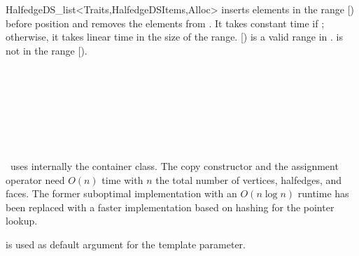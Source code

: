 \begin{ccRefClass}{HalfedgeDS_list<Traits,HalfedgeDSItems,Alloc>}
    {inserts elements in the range [) before position 
      and removes the elements from . It takes 
     constant time if \ccVar; otherwise, it takes linear
     time in the size of the range. \ccPrecond [) is a
     valid range in .  is not in the range
     [).}



\ccSeeAlso

\\
\\
\\
\\
\\
\\


\ccImplementation

\ccRefName\ uses internally the  container class.
The copy constructor and the assignment operator need $O(n)$ time with
$n$ the total number of vertices, halfedges, and faces. The former 
suboptimal implementation with an $O(n \log n)$ runtime has been replaced
with a faster implementation based on hashing for the pointer lookup.

 is used as default argument for the
 template parameter.  

\end{ccRefClass} %

\ccRefPageEnd
